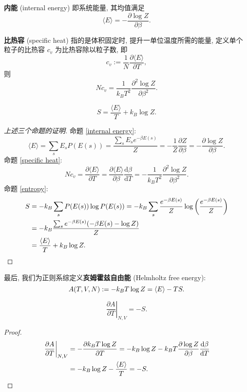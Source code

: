 \begin{proposition}[内能]
    \label{internal energy}
    {\bf 内能} (internal energy) 即系统能量, 其均值满足
    \[ \langle E\rangle=-\frac{\partial\log Z}{\partial\beta}. \]
\end{proposition}
\begin{proposition}[比热容]
    \label{specific heat}
    {\bf 比热容} (specific heat) 指的是体积固定时, 提升一单位温度所需的能量, 定义单个粒子的比热容 $ c_v $ 为比热容除以粒子数, 即
    \[ c_v:=\frac{1}{N}\frac{\partial \langle E\rangle}{\partial T}, \] 
    则
    \[ Nc_v=\frac{1}{k_BT^2}\frac{\partial^2\log Z}{\partial\beta^2}. \]
\end{proposition}
\vspace{1ex}
\begin{proposition}[熵]\keepline
    \label{entropy}
    \[ S=\frac{\langle E\rangle}{T}+k_B\log Z. \]
\end{proposition}
\vspace{1ex}
\begin{proof}[上述三个命题的证明]
    命题 \ref{internal energy}:
    \[ \langle E\rangle =\sum_s E_s P(E(s))=\frac{\sum_s E_se^{-\beta E(s)}}{Z}=-\frac{1}{Z}\frac{\partial Z}{\partial\beta}=-\frac{\partial\log Z}{\partial\beta}. \]
    命题 \ref{specific heat}:
    \[ Nc_v=\frac{\partial\langle E\rangle}{\partial T}=\frac{\partial\langle E\rangle}{\partial\beta}\frac{\mathrm{d}\beta}{\mathrm{d}T}=-\frac{1}{k_BT^2}\frac{\partial^2\log Z}{\partial\beta^2}. \]
    命题 \ref{entropy}:
    \begin{align*}
        S&=-k_B\sum_s P(E(s))\log P(E(s))=-k_B\sum_s\frac{e^{-\beta E(s)}}{Z}\log\left( \frac{e^{-\beta E(s)}}{Z} \right)\\
        &=-k_B\frac{\sum_s e^{-\beta E(s)}(-\beta E(s)-\log Z)}{Z}\\ 
        &= \frac{\langle E\rangle}{T}+k_B\log Z.\qedhere
    \end{align*}
\end{proof}
最后, 我们为正则系综定义{\bf 亥姆霍兹自由能} (Helmholtz free energy):
\[ A(T,V,N):=-k_BT\log Z=\langle E\rangle-TS.\vspace{2ex} \]
\begin{proposition}\keepline
    \[ \left.\frac{\partial A}{\partial T}\right|_{N,V}=-S. \]
\end{proposition}
\vspace{0ex}
\begin{proof}\keepline
    \begin{align*}
        \left.\frac{\partial A}{\partial T}\right|_{N,V}&=-\frac{\partial k_BT\log Z}{\partial T}=-k_B\log Z-k_BT\frac{\partial\log Z}{\partial\beta}\frac{\mathrm{d}\beta}{\mathrm{d}T}\\ 
        &=-k_B\log Z-\frac{\langle E\rangle}{T}=-S.\qedhere
    \end{align*}
\end{proof}
